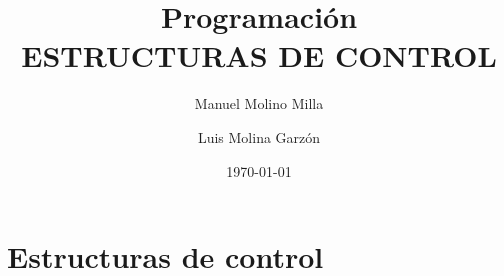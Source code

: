 \documentclass[4paper]{article}
\author{Manuel Molino Milla \and Luis Molina Garzón}
\title{\textbf{Programación}
\\ESTRUCTURAS DE CONTROL}
\date{\today}
\begin{document}
\maketitle
\tableofcontents


\section{Estructuras de control}
\end{document}
